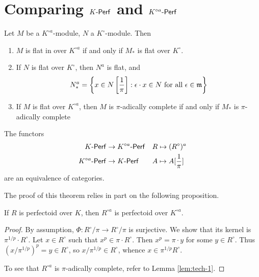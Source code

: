 \documentclass{article}
\begin{document}
\section{Comparing $K\textnormal{-}\mathsf{Perf}$ and $K^{\circ a}\textnormal{-}\mathsf{Perf}$} 

\begin{lemma}\label{lem:tech-1}
Let $M$ be a $K^{\circ a}$-module, $N$ a $K^\circ$-module. Then 
\begin{enumerate}
  \item $M$ is flat in over $K^{\circ a}$ if and only if $M_\ast$ is flat over $K^\circ$. 
  \item If $N$ is flat over $K^\circ$, then $N^a$ is flat, and 
    \[
      N_\ast^a = \left\{x\in N\left[\frac 1 \pi\right] : \epsilon\cdot x\in N\text{ for all }\epsilon\in\mathfrak{m}\right\} 
    \]
  \item If $M$ is flat over $K^{\circ a}$, then $M$ is $\pi$-adically complete if 
    and only if $M_\ast$ is $\pi$-adically complete
\end{enumerate}
\end{lemma}

\begin{theorem}
The functors 
\begin{align*}
  K\textnormal{-}\mathsf{Perf} &\to K^{\circ a}\textnormal{-}\mathsf{Perf} && R\mapsto (R^\circ)^a \\
  K^{\circ a}\textnormal{-}\mathsf{Perf} &\to K\textnormal{-}\mathsf{Perf} && A\mapsto A[\frac 1 \pi] 
\end{align*}
are an equivalence of categories. 
\end{theorem}

The proof of this theorem relies in part on the following proposition. 
\begin{proposition}
If $R$ is perfectoid over $K$, then $R^{\circ a}$ is perfectoid over $K^{\circ a}$. 
\end{proposition}
\begin{proof}
By assumption, $\Phi:R^\circ/\pi \to R^\circ/\pi$ is surjective. We show that 
its kernel is $\pi^{1/p}\cdot R^\circ$. Let 
$x\in R^\circ$ such that $x^p\in \pi\cdot R^\circ$. Then $x^p=\pi\cdot y$ for some 
$y\in R^\circ$. Thus $(x/\pi^{1/p})^p = y\in R^\circ$, so 
$x/\pi^{1/p}\in R^\circ$, whence 
$x\in \pi^{1/p} R^\circ$. 

To see that $R^{\circ a}$ is $\pi$-adically complete, refer to Lemma \ref{lem:tech-1}. 
\end{proof}
\end{document}
